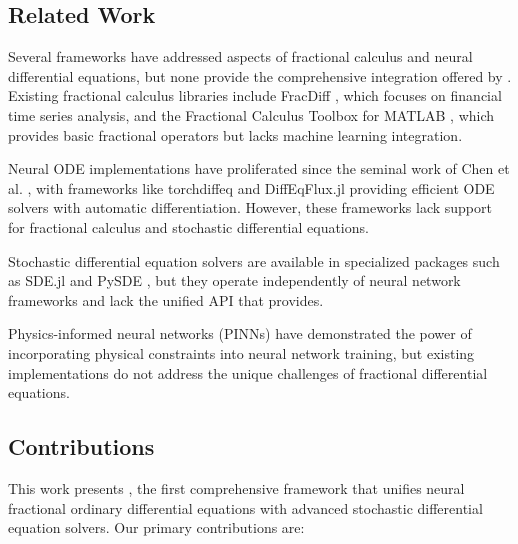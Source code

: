\subsection{Related Work}

Several frameworks have addressed aspects of fractional calculus and neural differential equations, but none provide the comprehensive integration offered by \hpfracc. Existing fractional calculus libraries include FracDiff \cite{fracdiff}, which focuses on financial time series analysis, and the Fractional Calculus Toolbox for MATLAB \cite{matlab_fractional}, which provides basic fractional operators but lacks machine learning integration.

Neural ODE implementations have proliferated since the seminal work of Chen et al. \cite{chen2018neural}, with frameworks like torchdiffeq \cite{torchdiffeq} and DiffEqFlux.jl \cite{diffeqflux} providing efficient ODE solvers with automatic differentiation. However, these frameworks lack support for fractional calculus and stochastic differential equations.

Stochastic differential equation solvers are available in specialized packages such as SDE.jl \cite{sde_jl} and PySDE \cite{pysde}, but they operate independently of neural network frameworks and lack the unified API that \hpfracc provides.

Physics-informed neural networks (PINNs) \cite{raissi2019physics} have demonstrated the power of incorporating physical constraints into neural network training, but existing implementations do not address the unique challenges of fractional differential equations.

\subsection{Contributions}

This work presents \hpfracc, the first comprehensive framework that unifies neural fractional ordinary differential equations with advanced stochastic differential equation solvers. Our primary contributions are:

